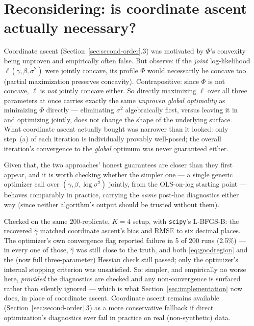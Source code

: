 \documentclass[11pt]{article}
\begin{document}
\section{Reconsidering: is coordinate ascent actually necessary?}
\label{sec:direct}

Coordinate ascent (Section~\ref{sec:second-order}.3) was motivated by
$\Phi$'s convexity being unproven and empirically often false. But observe:
if the \emph{joint} log-likelihood $\ell(\gamma,\beta,\sigma^2)$ were jointly
concave, its profile $\Phi$ would necessarily be concave too (partial
maximization preserves concavity). Contrapositive: since $\Phi$ is not
concave, $\ell$ is \emph{not} jointly concave either. So directly maximizing
$\ell$ over all three parameters at once carries exactly the same
\emph{unproven global optimality} as minimizing $\Phi$ directly --- eliminating
$\sigma^2$ algebraically first, versus leaving it in and optimizing jointly,
does not change the shape of the underlying surface. What coordinate ascent
actually bought was narrower than it looked: only step~(a) of each iteration
is individually provably well-posed; the overall iteration's convergence to
the \emph{global} optimum was never guaranteed either.

Given that, the two approaches' honest guarantees are closer than they first
appear, and it is worth checking whether the simpler one --- a single generic
optimizer call over $(\gamma,\beta,\log\sigma^2)$ jointly, from the
OLS-on-log starting point --- behaves comparably in practice, carrying the
\emph{same} post-hoc diagnostics either way (since neither algorithm's output
should be trusted without them).

Checked on the same 200-replicate, $K=4$ setup, with \texttt{scipy}'s
L-BFGS-B: the recovered $\hat\gamma$ matched coordinate ascent's bias and
RMSE to six decimal places. The optimizer's own convergence flag reported
failure in 5 of 200 runs (2.5\%) --- in every one of those, $\hat\gamma$ was
still close to the truth, and both \eqref{eq:goodregion} and the (now full
three-parameter) Hessian check still passed; only the optimizer's internal
stopping criterion was unsatisfied. So: simpler, and empirically no worse
here, \emph{provided} the diagnostics are checked and any non-convergence is
surfaced rather than silently ignored --- which is what
Section~\ref{sec:implementation} now does, in place of coordinate ascent.
Coordinate ascent remains available (Section~\ref{sec:second-order}.3) as a
more conservative fallback if direct optimization's diagnostics ever fail in
practice on real (non-synthetic) data.
\end{document}
